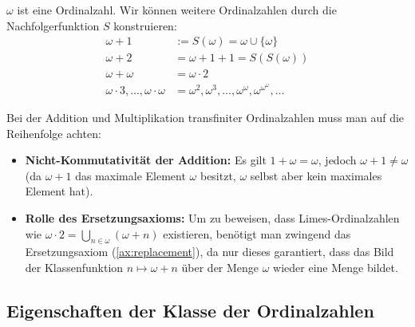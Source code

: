 \begin{math-stroke}
\begin{remark}
$\omega$ ist eine Ordinalzahl. Wir können weitere Ordinalzahlen durch die Nachfolgerfunktion $S$ konstruieren:
\begin{align*}
\omega + 1 &:= S(\omega) = \omega \cup \{\omega\} \\
\omega + 2 &= \omega + 1 + 1 = S(S(\omega)) \\
\omega + \omega &= \omega \cdot 2 \\
\omega \cdot 3, \dots, \omega \cdot \omega &= \omega^2, \omega^3, \dots, \omega^\omega, \omega^{\omega^\omega}, \dots
\end{align*}
\end{remark}

\begin{didactic-insight}
Bei der Addition und Multiplikation transfiniter Ordinalzahlen muss man auf die Reihenfolge achten:
\begin{itemize}
    \item \textbf{Nicht-Kommutativität der Addition:} Es gilt $1 + \omega = \omega$, jedoch $\omega + 1 \neq \omega$ (da $\omega + 1$ das maximale Element $\omega$ besitzt, $\omega$ selbst aber kein maximales Element hat).
    \item \textbf{Rolle des Ersetzungsaxioms:} Um zu beweisen, dass Limes-Ordinalzahlen wie $\omega \cdot 2 = \bigcup_{n \in \omega} (\omega + n)$ existieren, benötigt man zwingend das Ersetzungsaxiom (\cref{ax:replacement}), da nur dieses garantiert, dass das Bild der Klassenfunktion $n \mapsto \omega + n$ über der Menge $\omega$ wieder eine Menge bildet.
\end{itemize}
\end{didactic-insight}
\end{math-stroke}

\subsection{Eigenschaften der Klasse der Ordinalzahlen}

